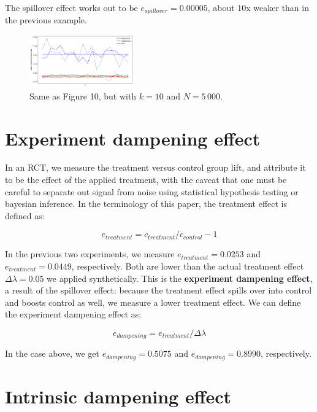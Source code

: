\documentclass[final,5p,times,twocolumn,authoryear]{elsarticle}
\begin{document}
The spillover effect works out to be $e_{spillover}=0.00005$, about 10x weaker than in the previous example.

\begin{figure}[h]
	\centering 
	\includegraphics[width=0.4\textwidth]{figure-11.png}	
	\caption{Same as Figure 10, but with $k=10$ and $N=5\,000$.} 
\end{figure}

\section{Experiment dampening effect}

In an RCT, we measure the treatment versus control group lift, and attribute it to be the effect of the applied treatment, with the caveat that one must be careful to separate out signal from noise using statistical hypothesis testing or bayesian inference. In the terminology of this paper, the treatment effect is defined as:

\begin{equation}
e_{treatment} = c_{treatment} / c_{control} - 1
\end{equation}

In the previous two experiments, we measure $e_{treatment} = 0.0253$ and $e_{treatment} = 0.0449$, respectively. Both are lower than the actual treatment effect $\Delta \lambda = 0.05$ we applied synthetically. This is the \textbf{experiment dampening effect}, a result of the spillover effect: because the treatment effect spills over into control and boosts control as well, we measure a lower treatment effect. We can define the experiment dampening effect as:

\begin{equation}
e_{dampening} = e_{treatment} / \Delta \lambda
\end{equation}

In the case above, we get $e_{dampening} = 0.5075$ and $e_{dampening} = 0.8990$, respectively.

\section{Intrinsic dampening effect}
\end{document}
